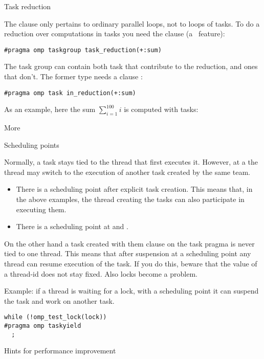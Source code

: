  {Task reduction}

The  clause only pertains to ordinary parallel loops,
not to  loops of tasks.
To do a reduction over computations in tasks you need the
 clause
(a~ feature):
\begin{lstlisting}
#pragma omp taskgroup task_reduction(+:sum)
\end{lstlisting}
The task group can contain both task that contribute to the reduction,
and ones that don't. The former type needs a clause :
\begin{lstlisting}
#pragma omp task in_reduction(+:sum)
\end{lstlisting}

As an example, here the sum $\sum_{i=1}^{100} i$ is computed with tasks:
%

 {More}

 {Scheduling points}

Normally, a task stays tied to the thread that first executes it.
However, at a  the thread may
switch to the execution of another task created by the same team.
\begin{itemize}
\item There is a scheduling point after explicit task creation. This
  means that, in the above examples, the thread creating the tasks can
  also participate in executing them.
\item There is a scheduling point at  and .
\end{itemize}

On the other hand a task created with them  clause
on the task pragma is never tied to one thread. This means that after
suspension at a scheduling point any thread can resume execution of
the task.
If you do this, beware
that the value of a thread-id does not stay fixed. Also locks become a problem.

Example: if a thread is waiting for a lock, with a scheduling point it
can suspend the task and work on another task.
\begin{lstlisting}
while (!omp_test_lock(lock))
#pragma omp taskyield
  ;
\end{lstlisting}

 {Hints for performance improvement}
\label{sec:omp-task-hint}


